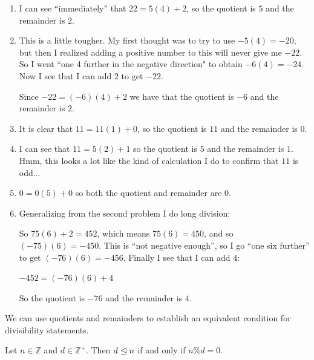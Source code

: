 \begin{solutions}
	\begin{enumerate}
		\item I can see ``immediately'' that $22 = 5(4) + 2$, so the quotient is $5$ and the remainder is $2$.
		\item This is a little tougher.  My first thought was to try to use $-5(4) =-20$, but then I realized adding a positive number to this will never give me $-22$.  So I went ``one 4 further in the negative direction" to obtain $-6(4) = -24$.  Now I see that I can add $2$ to get $-22$.
		
		Since $-22 = (-6)(4) + 2$ we have that the quotient is $-6$ and the remainder is $2$.
		\item It is clear that $11 = 11(1) + 0$, so the quotient is $11$ and the remainder is $0$.
		\item I can see that $11 = 5(2)+ 1$ so the quotient is $5$ and the remainder is $1$.  Hmm, this looks a lot like the kind of calculation I do to confirm that $11$ is odd...
		\item $0 = 0(5) + 0$ so both the quotient and remainder are $0$.
		\item Generalizing from the second problem I do long division:
		
    
    So $75(6)+2= 452$, which means $75(6) = 450$, and so $(-75)(6) = -450$.  This is ``not negative enough'', so I go ``one six further'' to get $(-76)(6) = -456$.  Finally I see that I can add $4$:
    
    $-452 = (-76)(6) + 4$
    
    So the quotient is $-76$ and the remainder is $4$.
    \end{enumerate}
	\end{solutions}


We can use quotients and remainders to establish an equivalent condition for divisibility statements.

\begin{theorem}
		Let $n \in \mathbb{Z}$ and $d \in \mathbb{Z}^+$.  Then $d \trianglelefteq n$ if and only if $n \% d = 0$.
	\end{theorem}

